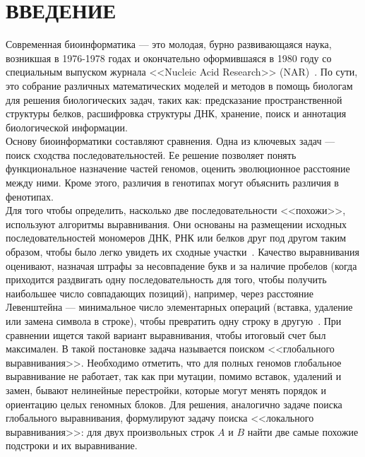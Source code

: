 \newpage
\part*{\large \centering ВВЕДЕНИЕ}
\hspace{\parindent} Современная биоинформатика --- это молодая, бурно развивающаяся наука, возникшая в 1976-1978 годах и окончательно оформившаяся в 1980 году со специальным выпуском журнала <<Nucleic Acid Research>> (NAR)~\cite{MironovLect}. По сути, это собрание различных математических моделей и методов в помощь биологам для решения биологических задач, таких как: предсказание пространственной структуры белков, расшифровка структуры ДНК, хранение, поиск и аннотация биологической информации.\\
\indent Основу биоинформатики составляют сравнения. Одна из ключевых задач --- поиск сходства последовательностей. Ее решение позволяет понять функциональное назначение частей геномов, оценить эволюционное расстояние между ними. Кроме этого, различия в генотипах могут объяснить различия в фенотипах.\\
\indent Для того чтобы определить, насколько две последовательности <<похожи>>, используют алгоритмы выравнивания. Они основаны на размещении исходных последовательностей мономеров ДНК, РНК или белков друг под другом таким образом, чтобы было легко увидеть их сходные участки~\cite{WikiPairAlign}. Качество выравнивания оценивают, назначая штрафы за несовпадение букв и за наличие пробелов (когда приходится раздвигать одну последовательность для того, чтобы получить наибольшее число совпадающих позиций), например, через расстояние Левенштейна --- минимальное число элементарных операций (вставка, удаление или замена символа в строке), чтобы превратить одну строку в другую~\cite{Levenshtein}. При сравнении ищется такой вариант выравнивания, чтобы итоговый счет был максимален. В такой постановке задача называется поиском <<глобального выравнивания>>. Необходимо отметить, что для полных геномов глобальное выравнивание не работает, так как при мутации, помимо вставок, удалений и замен, бывают нелинейные перестройки, которые могут менять порядок и ориентацию целых геномных блоков. Для решения, аналогично задаче поиска глобального выравнивания, формулируют задачу поиска <<локального выравнивания>>: для двух произвольных строк $A$ и $B$ найти две самые похожие подстроки и их выравнивание.\\ 
